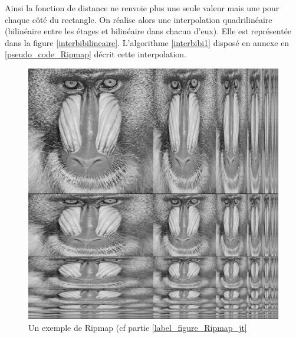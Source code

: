 Ainsi la fonction de distance ne renvoie plus une seule valeur mais une pour chaque côté du rectangle. On réalise alors une interpolation quadrilinéaire (bilinéaire entre les étages et bilinéaire dans chacun d'eux). Elle est représentée dans la figure \ref{interbibilineaire}. L'algorithme \ref{interbibi1} disposé en annexe en \ref{pseudo_code_Ripmap} décrit cette interpolation.


\label{label_figure_Ripmap_jt}
\begin{figure}[h!]
\centering
\includegraphics[scale=0.4]{Ripmap_real}
\caption{Un exemple de Ripmap (cf partie \ref{label_figure_Ripmap_jt}}
\label{Ripmap_real}
\end{figure}


